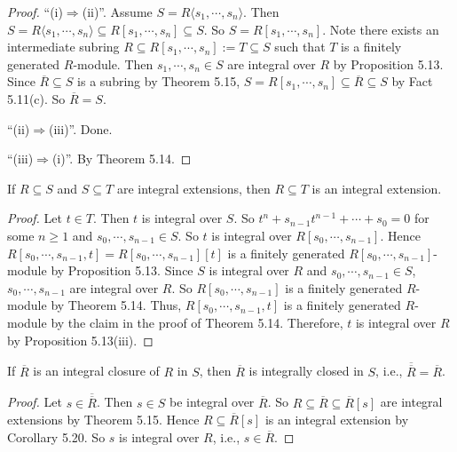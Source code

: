 \begin{proof}
    ``(i)$\Rightarrow$(ii)''. Assume $S = R\langle s_1,\cdots,s_n \rangle$. Then $S = R\langle s_1,\cdots,s_n \rangle \subseteq R[s_1,\cdots,s_n] \subseteq S$. So $S = R[s_1,\cdots,s_n]$. Note there exists an intermediate subring $R \subseteq R[s_1,\cdots,s_n] := T \subseteq S$ such that $T$ is a finitely generated $R$-module. Then $s_1,\cdots,s_n \in S$ are integral over $R$ by Proposition 5.13. Since $\overbar{R} \subseteq S$ is a subring by Theorem 5.15, $S = R[s_1,\cdots,s_n] \subseteq \overbar{R} \subseteq S$ by Fact 5.11(c). So $\overbar{R} = S$. \par
    ``(ii)$\Rightarrow$(iii)''. Done. \par 
    ``(iii)$\Rightarrow$(i)''. By Theorem 5.14.
\end{proof}


\begin{corollary}
    If $R \subseteq S$ and $S \subseteq T$ are integral extensions, then $R \subseteq T$ is an integral extension.
\end{corollary}

\begin{proof}
    Let $t \in T$. Then $t$ is integral over $S$. So $t^n + s_{n-1} t^{n-1} + \cdots + s_0 = 0$ for some $n \geq 1$ and $s_0,\cdots,s_{n-1} \in S$. So $t$ is integral over $R[s_0,\cdots,s_{n-1}]$. Hence $R[s_0,\cdots,s_{n-1},t] = R[s_0,\cdots,s_{n-1}][t]$ is a finitely generated $R[s_0,\cdots,s_{n-1}]$-module by Proposition 5.13. Since $S$ is integral over $R$ and $s_0,\cdots,s_{n-1} \in S$, $s_0,\cdots,s_{n-1}$ are integral over $R$. So $R[s_0,\cdots,s_{n-1}]$ is a finitely generated $R$-module by Theorem 5.14. Thus, $R[s_0,\cdots,s_{n-1},t]$ is a finitely generated $R$-module by the claim in the proof of Theorem 5.14. Therefore, $t$ is integral over $R$ by Proposition 5.13(iii).
\end{proof}

\begin{corollary}
    If $\overbar{R}$ is an integral closure of $R$ in $S$, then $\overbar{R}$ is integrally closed in $S$, i.e., ${\overbar{\overbar{R}}} = \overbar{R}$.
\end{corollary}

\begin{proof}
    Let $s \in \overbar{\overbar{R}}$. Then $s \in S$ be integral over $\overbar{R}$. So $R \subseteq \overbar{R} \subseteq \overbar{R}[s]$ are integral extensions by Theorem 5.15. Hence $R \subseteq \overbar{R}[s]$ is an integral extension by Corollary 5.20. So $s$ is integral over $R$, i.e., $s \in \overbar{R}$.
\end{proof}

